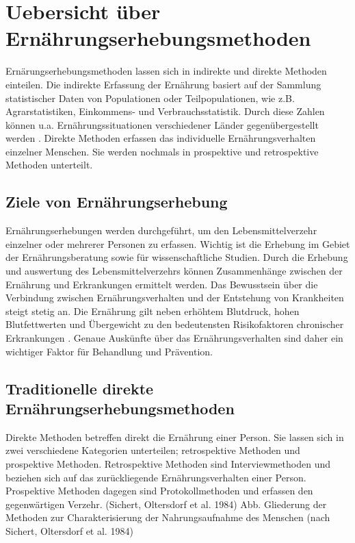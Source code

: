 \section{Uebersicht über Ernährungserhebungsmethoden}

Ernärungserhebungsmethoden lassen sich in indirekte und direkte Methoden einteilen. Die indirekte Erfassung der Ernährung basiert auf der Sammlung statistischer Daten von Populationen oder Teilpopulationen, wie z.B. Agrarstatistiken, Einkommens- und Verbrauchsstatistik. Durch diese Zahlen können u.a. Ernährungssituationen verschiedener Länder gegenübergestellt werden \cite{muller2007ernahrungsmedizinische}. Direkte Methoden erfassen das individuelle Ernährungsverhalten einzelner Menschen. Sie werden nochmals in prospektive und retrospektive Methoden unterteilt. 


\subsection{Ziele von Ernährungserhebung}

Ernährungserhebungen werden durchgeführt, um den Lebensmittelverzehr einzelner oder mehrerer Personen zu erfassen. Wichtig ist die Erhebung im Gebiet der Ernährungsberatung sowie für wissenschaftliche Studien. Durch die Erhebung und auswertung des Lebensmittelverzehrs können Zusammenhänge zwischen der Ernährung und Erkrankungen ermittelt werden. Das Bewusstsein über die Verbindung zwischen Ernährungsverhalten und der Entstehung von Krankheiten steigt stetig an. Die Ernährung gilt neben erhöhtem Blutdruck, hohen Blutfettwerten und Übergewicht zu den bedeutensten Risikofaktoren chronischer Erkrankungen \cite{hurrelmann2004einfuhrung}. Genaue Auskünfte über das Ernährungsverhalten sind daher ein wichtiger Faktor für Behandlung und Prävention. 

\subsection{Traditionelle direkte Ernährungserhebungsmethoden}

Direkte Methoden betreffen direkt die Ernährung einer Person.  Sie lassen sich in zwei verschiedene Kategorien unterteilen; retrospektive Methoden und prospektive Methoden. Retrospektive Methoden sind Interviewmethoden und beziehen sich auf das zurückliegende Ernährungsverhalten einer Person.  Prospektive Methoden dagegen sind Protokollmethoden und erfassen den gegenwärtigen Verzehr. (Sichert, Oltersdorf et al. 1984)
Abb. Gliederung der Methoden zur Charakterisierung der Nahrungsaufnahme des Menschen (nach Sichert, Oltersdorf et al. 1984)

